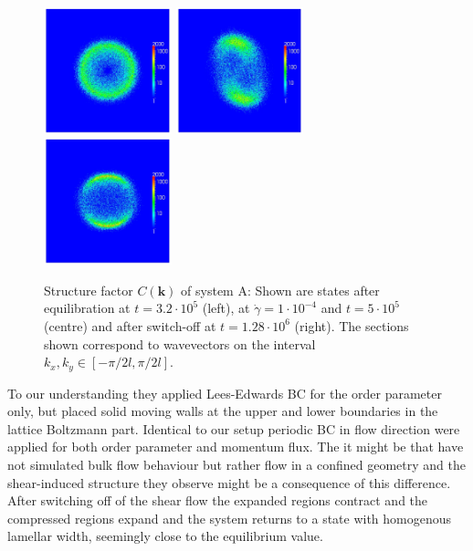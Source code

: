 \documentclass[8.5pt,twoside,twocolumn]{article}
\newcommand{\e}[1]{\cdot10^{#1}}
\begin{document}
\begin{figure}[!]
\centering
\includegraphics[angle=0,width=0.33\textwidth]{ck_run703_320.jpg}
\includegraphics[angle=0,width=0.33\textwidth]{ck_run704_500.jpg}
\includegraphics[angle=0,width=0.33\textwidth]{ck_run705_1280.jpg}
\caption{Structure factor $C({\bm k})$ of system A: Shown are states after equilibration at $t=3.2\e{5}$ (left), at $\dot{\gamma}=1\cdot10^{-4}$ and $t=5\e{5}$ (centre) and after switch-off at $t=1.28\e{6}$ (right). The sections shown correspond to wavevectors on the interval $k_x, k_y \in [-\pi/2 l,\pi/2 l]$.}
\label{fig4}
\end{figure}
To our understanding they applied Lees-Edwards BC for the order parameter only, but placed solid moving walls at the upper and lower boundaries in the lattice Boltzmann part.
Identical to our setup periodic BC in flow direction were applied for both order parameter and momentum flux.
The it might be that \cite{Xu06b} have not simulated bulk flow behaviour but rather flow in a confined geometry and the shear-induced structure they observe might be a consequence of this difference.\\ 
After switching off of the shear flow the expanded regions contract and the compressed regions expand and the system returns to a state with homogenous lamellar width, seemingly close to the equilibrium value.
\end{document}
